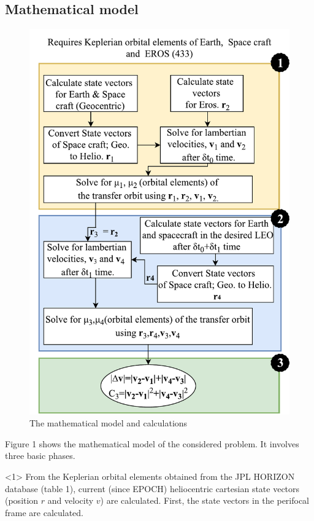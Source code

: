 \documentclass[11pt,a4paper]{article}
\begin{document}
\begin{multicols}{2}
\section{Mathematical model}
\begin{figure}[H]
\centering
\includegraphics{images/model.pdf}
\caption{The mathematical model and calculations}
\end{figure}
Figure 1 shows the mathematical model of the considered problem. It involves three basic phases.

{\LARGE{{<1>}}} From the Keplerian orbital elements obtained from the JPL HORIZON database (table 1), current (since EPOCH) heliocentric cartesian state vectors (position $r$ and velocity $v$) are calculated. First, the state vectors in the perifocal frame are calculated.


\end{multicols}
\end{document}
